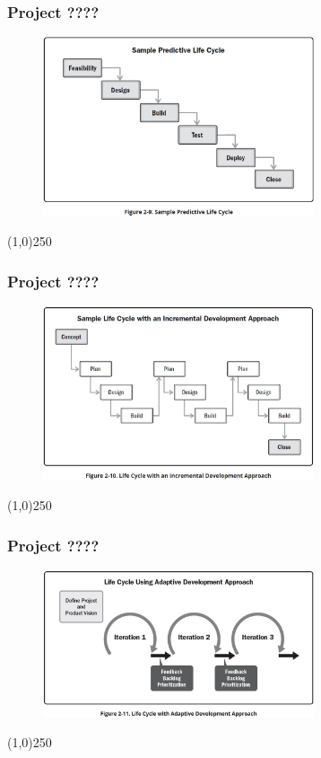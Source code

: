 \begin{frame}
\frametitle{Project ????}
 \begin{figure}
    \centering
        \includegraphics[width = 8cm]{../images/guide/Fig2-9.jpg}
    \label{guidefig:2-9}
 \end{figure}
\end{frame}
\begin{center}\line(1,0){250}\end{center}

\begin{frame}
\frametitle{Project ????}
 \begin{figure}
    \centering
        \includegraphics[width = 8cm]{../images/guide/Fig2-10.jpg}
    \label{guidefig:2-10}
 \end{figure}
\end{frame}
\begin{center}\line(1,0){250}\end{center}

\begin{frame}
\frametitle{Project ????}
 \begin{figure}
    \centering
        \includegraphics[width = 8cm]{../images/guide/Fig2-11.jpg}
    \label{guidefig:2-11}
 \end{figure}
\end{frame}
\begin{center}\line(1,0){250}\end{center}

